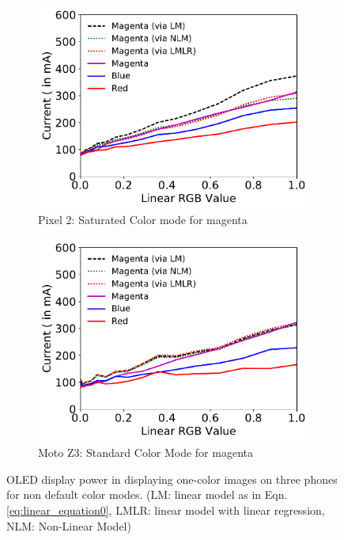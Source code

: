 \begin{figure}[tp]
        \hfill
	\begin{subfigure}[]{0.31\textwidth}
		\includegraphics[width=\textwidth]{./figure/1631_P2_Saturated_Magenta.pdf}
		\caption{Pixel 2: Saturated Color mode for magenta}
		\label{fig:initial_evaluation_2_p2_m_c}
	\end{subfigure}
        \hfill
	\begin{subfigure}[]{0.31\textwidth}
		\includegraphics[width=\textwidth]{./figure/1633_Z3_Standard_Magenta.pdf}
		\caption{Moto Z3: Standard Color Mode for magenta}
		\label{fig:initial_evaluation_2_z3_m_c}
	\end{subfigure}
        \vspace{-0.1in}
	\caption{OLED display power in displaying one-color images on three phones
		for non default color modes.
		(LM: linear model as in Eqn.\ref{eq:linear_equation0},
		 LMLR: linear model with linear regression, NLM: Non-Linear Model)
		}
        \label{fig:initial_evaluation_color_mode}
\end{figure}

